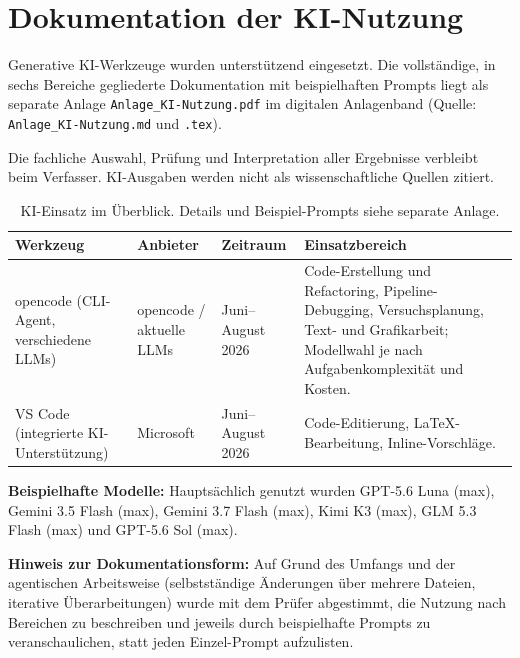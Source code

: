 \section{Dokumentation der KI-Nutzung}

Generative KI-Werkzeuge wurden unterstützend eingesetzt. Die vollständige,
in sechs Bereiche gegliederte Dokumentation mit beispielhaften Prompts liegt als
separate Anlage \texttt{Anlage\_KI-Nutzung.pdf} im digitalen Anlagenband
(Quelle: \texttt{Anlage\_KI-Nutzung.md} und \texttt{.tex}).

Die fachliche Auswahl, Prüfung und Interpretation aller Ergebnisse verbleibt
beim Verfasser. KI-Ausgaben werden nicht als wissenschaftliche Quellen
zitiert.

\begin{table}[H]
\centering
\small
\begin{tabularx}{\textwidth}{p{3.0cm}p{3.2cm}p{2.5cm}X}
\toprule
Werkzeug & Anbieter & Zeitraum & Einsatzbereich\\
\midrule
opencode (CLI-Agent, verschiedene LLMs) & opencode / aktuelle LLMs & Juni--August 2026 &
Code-Erstellung und Refactoring, Pipeline-Debugging, Versuchsplanung, Text- und Grafikarbeit; Modellwahl je nach Aufgabenkomplexität und Kosten.\\
VS Code (integrierte KI-Unterstützung) & Microsoft & Juni--August 2026 &
Code-Editierung, LaTeX-Bearbeitung, Inline-Vorschläge.\\
\bottomrule
\end{tabularx}
\caption{KI-Einsatz im Überblick. Details und Beispiel-Prompts siehe separate Anlage.}
\end{table}

\textbf{Beispielhafte Modelle:} Hauptsächlich genutzt wurden GPT-5.6 Luna
(max), Gemini 3.5 Flash (max), Gemini 3.7 Flash (max), Kimi K3 (max),
GLM 5.3 Flash (max) und GPT-5.6 Sol (max).

\textbf{Hinweis zur Dokumentationsform:} Auf Grund des Umfangs und der
agentischen Arbeitsweise (selbstständige Änderungen über mehrere Dateien,
iterative Überarbeitungen) wurde mit dem Prüfer abgestimmt, die Nutzung nach
Bereichen zu beschreiben und jeweils durch beispielhafte Prompts zu
veranschaulichen, statt jeden Einzel-Prompt aufzulisten.
